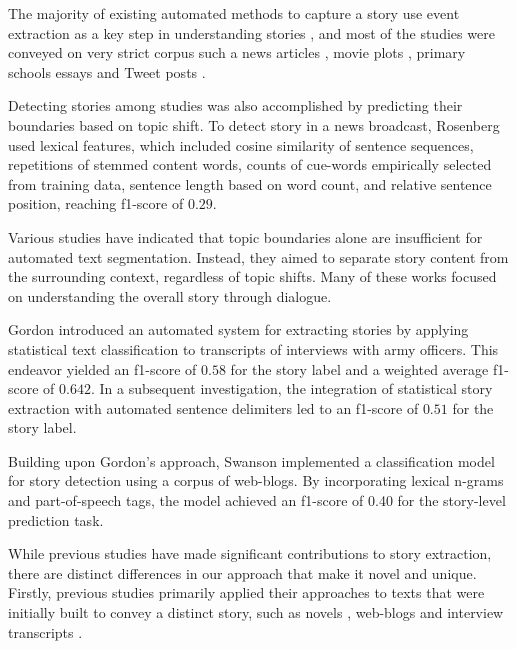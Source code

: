 \documentclass[preprint,12pt]{elsarticle}
\begin{document}
The majority of existing automated methods to capture a story use event extraction as a key step in understanding stories \cite{norambuena2023survey}, and most of the studies were conveyed on very strict corpus such a news articles \cite{levi2022detecting, yu2021automatic, ge2010story, chambers2008unsupervised}, movie plots \cite{martin2018event}, primary schools essays \cite{halpin2006event} and Tweet posts \cite{wang2019open}. 

Detecting stories among studies was also accomplished by predicting their boundaries based on topic shift. To detect story in a news broadcast, Rosenberg \cite{rosenberg2006story} used lexical features, which included cosine similarity of sentence sequences, repetitions of stemmed content words, counts of cue-words empirically selected from training data, sentence length based on word count, and relative sentence position, reaching f1-score of $0.29$.

Various studies \cite{gordon2007automated,swansonfirst,engin2021hidden} have indicated that topic boundaries alone are insufficient for automated text segmentation. Instead, they aimed to separate story content from the surrounding context, regardless of topic shifts. Many of these works focused on understanding the overall story through dialogue.

Gordon \cite{gordon2005automated} introduced an automated system for extracting stories by applying statistical text classification to transcripts of interviews with army officers. This endeavor yielded an f1-score of $0.58$ for the story label and a weighted average f1-score of $0.642$. In a subsequent investigation, the integration of statistical story extraction with automated sentence delimiters led to an f1-score of $0.51$ for the story label\cite{gordon2007automated}.

Building upon Gordon's approach, Swanson \cite{swansonfirst} implemented a classification model for story detection using a corpus of web-blogs. By incorporating lexical n-grams and part-of-speech tags, the model achieved an f1-score of 0.40 for the story-level prediction task.

While previous studies have made significant contributions to story extraction, there are distinct differences in our approach that make it novel and unique. Firstly, previous studies primarily applied their approaches to texts that were initially built to convey a distinct story, such as novels  \cite{iikura2021paragraph}, web-blogs \cite{swansonfirst} and interview transcripts \cite{gordon2007automated}.
\end{document}
